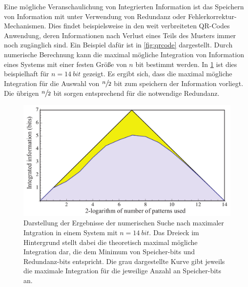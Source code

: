 Eine mögliche Veranschaulichung von Integrierten Information ist das Speichern von Information mit 
unter Verwendung von Redundanz oder Fehlerkorrektur-Mechanismen. Dies findet beispielsweise in 
den weit verbreiteten QR-Codes Anwendung, deren Informationen nach Verlust eines Teils des Musters immer
noch zugänglich sind. Ein Beispiel dafür ist in \cref{fig:qrcode} dargestellt.
Durch numerische Berechnung kann die maximal mögliche Integration von Information eines Systems mit einer
festen Größe  von $n$ bit bestimmt werden. In  \cref{fig:maximal_integrated_information} ist dies beispielhaft 
für $n = \SI{14}{bit}$ gezeigt. Es ergibt sich, dass die maximal mögliche Integration für die Auswahl von 
{$\large \sfrac{n}{2}$} bit  zum speichern der Information vorliegt. Die übrigen {$\large \sfrac{n}{2}$} bit sorgen 
entsprechend für die notwendige Redundanz.

 
\begin{figure}%
	\centering
	\includegraphics[scale=0.2]{graphics/integrated_information_graph.jpg}
	\caption{Darstellung der Ergebnisse der numerischen Suche nach maximaler Intgration in einem System 
		mit $n = \SI{14}{bit}$. Das Dreieck im Hintergrund stellt dabei die theoretisch maximal mögliche 
		Integration dar, die dem Minimum von Speicher-bits und Redundanz-bits entspricht. Die grau dargestellte
		Kurve gibt jeweils die maximale Integration für die jeweilige Anzahl an Speicher-bits an. \label{fig:maximal_integrated_information}}
\end{figure}  

